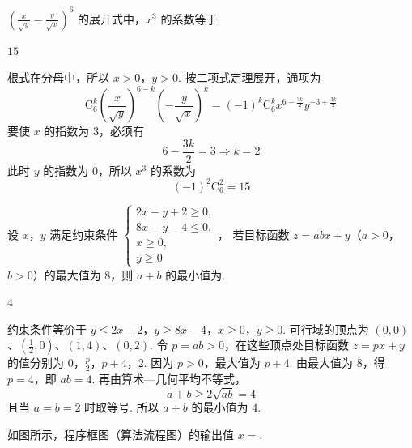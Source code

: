 \begin{problem}
\(\left(\frac{x}{\sqrt{y}} - \frac{y}{\sqrt{x}}\right)^{6}\) 的展开式中，\(x^{3}\) 的系数等于\fillinblank{}.
\end{problem}

\begin{answer}
\(15\)
\end{answer}

\begin{solution}
根式在分母中，所以 \(x>0\)，\(y>0\). 按二项式定理展开，通项为
\[
\mathrm C_6^k\left(\frac{x}{\sqrt y}\right)^{6-k}
\left(-\frac{y}{\sqrt x}\right)^k
=(-1)^k\mathrm C_6^k x^{6-\frac{3k}{2}}y^{-3+\frac{3k}{2}}
\]
要使 \(x\) 的指数为 \(3\)，必须有
\[
6-\frac{3k}{2}=3\Longrightarrow k=2
\]
此时 \(y\) 的指数为 \(0\)，所以 \(x^3\) 的系数为
\[
(-1)^2\mathrm C_6^2=15
\]
\end{solution}

\begin{problem}
设 \(x\)，\(y\) 满足约束条件 \(\begin{cases}
2x - y + 2 \geqslant 0,\\
8x - y - 4 \leqslant 0,\\
x \geqslant 0,\\
y \geqslant 0
\end{cases}\)，
若目标函数 \(z = abx + y\)（\(a > 0\)，\(b > 0\)）的最大值为 \(8\)，则 \(a + b\) 的最小值为\fillinblank{}.
\end{problem}

\begin{answer}
\(4\)
\end{answer}

\begin{solution}
约束条件等价于
\(y\leqslant2x+2\)，\(y\geqslant8x-4\)，\(x\geqslant0\)，\(y\geqslant0\).
可行域的顶点为 \((0,0)\)、\((\frac{1}{2},0)\)、\((1,4)\)、\((0,2)\). 令 \(p=ab>0\)，在这些顶点处目标函数 \(z=px+y\) 的值分别为
\(0\)，\(\frac{p}{2}\)，\(p+4\)，\(2\).
因为 \(p>0\)，最大值为 \(p+4\). 由最大值为 \(8\)，得 \(p=4\)，即 \(ab=4\). 再由算术—几何平均不等式，
\[
a+b\geqslant2\sqrt{ab}=4
\]
且当 \(a=b=2\) 时取等号. 所以 \(a+b\) 的最小值为 \(4\).
\end{solution}

\begin{problem}
如图所示，程序框图（算法流程图）的输出值 \(x =\)\fillinblank{}.

\end{problem}

